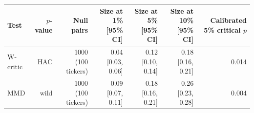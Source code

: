 \begin{tabular}{lrrrrrr}
\toprule
Test & $p$-value & Null pairs & Size at 1\% [95\% CI] & Size at 5\% [95\% CI] & Size at 10\% [95\% CI] & Calibrated 5\% critical $p$ \\
\midrule
W-critic & HAC & 1000 (100 tickers) & 0.04 [0.03, 0.06] & 0.12 [0.10, 0.14] & 0.18 [0.16, 0.21] & 0.014 \\
MMD & wild & 1000 (100 tickers) & 0.09 [0.07, 0.11] & 0.18 [0.16, 0.21] & 0.26 [0.23, 0.28] & 0.004 \\
\bottomrule
\end{tabular}
